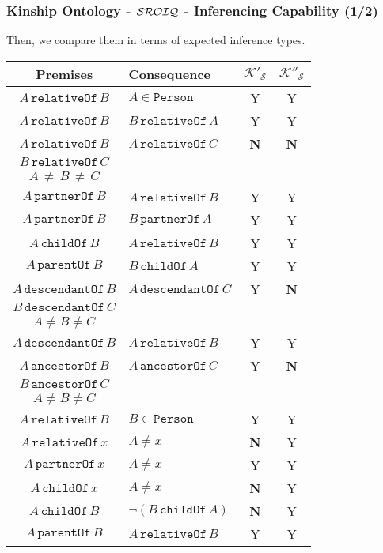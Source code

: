 \documentclass[8pt]{beamer}
\newcommand{\Persons}{\mathtt{Person}}
\newcommand{\relative}{\mathtt{relativeOf}}
\newcommand{\partner}{\mathtt{partnerOf}}
\newcommand{\child}{\mathtt{childOf}}
\newcommand{\parent}{\mathtt{parentOf}}
\newcommand{\ancestor}{\mathtt{ancestorOf}}
\newcommand{\descendant}{\mathtt{descendantOf}}
\newcommand{\Alice}{A}
\newcommand{\Bob}{B}
\newcommand{\Charlie}{C}
\newcommand{\KBtra}{\mathcal{K}'_{\mathcal{S}}}
\newcommand{\KBirr}{\mathcal{K}''_{\mathcal{S}}}
\newcommand{\testpassed}{\textsf{Y}}
\newcommand{\testfailed}{\bf{\textsf{N}}}
\begin{document}
\begin{frame}
\frametitle{Kinship Ontology - $\mathcal{SROIQ}$ - Inferencing Capability (1/2) }

Then, we compare them in terms of expected inference types.
\vspace{\baselineskip}
\begin{center}
\begin{small}
\begin{tabular}{|c|l|c|c|}
\hline
\bf{Premises} & \bf{Consequence} & $\KBtra$ & $\KBirr$ \\
\hline
$\Alice\,\relative\,\Bob$ & $\Alice \in \Persons$ & \testpassed & \testpassed\\
\hline
$\Alice\,\relative\,\Bob$ & $\Bob\,\relative\,\Alice$ & \testpassed & \testpassed \\
\hline
$\Alice\,\relative\,\Bob$ & $\Alice\,\relative\,\Charlie$ & \testfailed & \testfailed\\
$\Bob\,\relative\,\Charlie$&&&\\
$\Alice\,\neq\,\Bob\,\neq\,\Charlie$&&&\\
\hline
$\Alice\,\partner\,\Bob$ & $\Alice\,\relative\,\Bob$ & \testpassed & \testpassed\\
\hline
$\Alice\,\partner\,\Bob$ & $\Bob\,\partner\,\Alice$ & \testpassed & \testpassed\\
\hline
$\Alice\,\child\,\Bob$ & $\Alice\,\relative\,\Bob$  & \testpassed & \testpassed\\
\hline
$\Alice\,\parent\,\Bob$ & $\Bob\,\child\,\Alice$ & \testpassed & \testpassed\\
\hline
$\Alice\,\descendant\,\Bob$ & $\Alice\,\descendant\,\Charlie$ & \testpassed & \testfailed\\
$\Bob\,\descendant\,\Charlie$ & & &\\
$\Alice \neq \Bob \neq \Charlie$ & & &\\
\hline
$\Alice\,\descendant\,\Bob$ & $\Alice\,\relative\,\Bob$ & \testpassed & \testpassed\\
\hline
$\Alice\,\ancestor\,\Bob$ & $\Alice\,\ancestor\,\Charlie$ & \testpassed & \testfailed\\
$\Bob\,\ancestor\,\Charlie$ & & &\\
$\Alice\neq\Bob\neq\Charlie$& & &\\
\hline
$\Alice\,\relative\,\Bob$ & $\Bob \in \Persons$ & \testpassed & \testpassed\\
\hline
$\Alice\,\relative\,x$ & $\Alice\neq x$ & \testfailed & \testpassed\\
\hline
$\Alice\,\partner\,x$ & $\Alice\neq x$ & \testpassed & \testpassed\\
\hline
$\Alice\,\child\,x$ & $\Alice \neq x$ & \testfailed & \testpassed\\
\hline
$\Alice\,\child\,\Bob$ & $\neg ( \Bob\,\child\,\Alice)$ & \testfailed & \testpassed\\
\hline
$\Alice\,\parent\,\Bob$ & $\Alice\,\relative\,\Bob$ & \testpassed & \testpassed\\
\hline
\end{tabular}
\end{small}
\end{center}
\end{frame}
\end{document}
